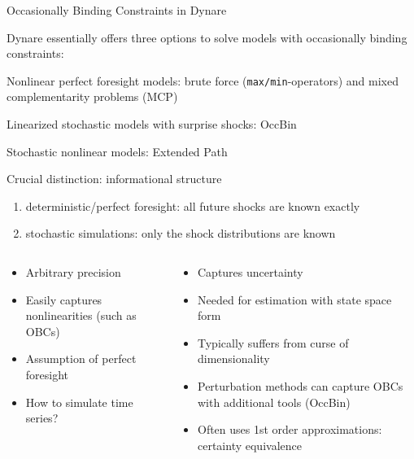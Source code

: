\begin{frame}{Occasionally Binding Constraints in Dynare}
	\begin{wideitemize}
        \item Dynare essentially offers three options to solve models with occasionally binding constraints:
        \begin{wideenumerate}
	    \item Nonlinear perfect foresight models: brute force (\texttt{max/min}-operators) and mixed complementarity problems (MCP)
	    \item Linearized stochastic models with surprise shocks: OccBin
        \item Stochastic nonlinear models: Extended Path
        \end{wideenumerate}
	\end{wideitemize}
\end{frame}


\begin{frame}{Crucial distinction: informational structure}

\begin{enumerate}
 \item deterministic/perfect foresight: all future shocks are known exactly
  \item stochastic simulations: only the shock distributions are known
\end{enumerate}

\begin{columns}[T]
\begin{wideitemize}
    \item {}
     \begin{itemize}
	        \item[+] Arbitrary precision
	        \item[+] Easily captures nonlinearities (such as OBCs)
	        \item[--] Assumption of perfect foresight
	        \item[--] How to simulate time series?
	    \end{itemize}
\end{wideitemize}
\begin{wideitemize}
    \item {}
	      \begin{itemize}
	        \item[+] Captures uncertainty
	        \item[+] Needed for estimation with state space form
            \item[--] Typically suffers from curse of dimensionality
	        \item[+] Perturbation methods can capture OBCs with additional tools (OccBin)
	        \item[--] Often uses 1st order approximations: certainty equivalence
	    \end{itemize}
\end{wideitemize}
\end{columns}
\end{frame}
